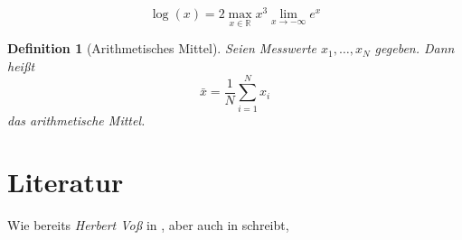 \documentclass[
    fontsize=11pt,%
    paper=b5,%
    headings=small,
    parskip=half,
    listof=totoc,
    bibliography=totoc,
    pagesize
]{scrbook}
\theoremstyle{break}
\newtheorem{definition}{Definition}[chapter]
\theoremstyle{plain}
\newcommand{\autor}[1]{\textit{#1}} %
\begin{document}
\[
\log(x)=2\max_{x\in \mathbb{R}}x^3\lim_{x\to-\infty}e^x
\]

\begin{definition}[Arithmetisches Mittel]
    Seien Messwerte $x_1,\ldots,x_N$ gegeben. Dann heißt
    \begin{equation}
    \bar{x}=\frac{1}{N}\sum_{i=1}^{N}x_i
    \end{equation}
    das arithmetische Mittel.
\end{definition}

\section{Literatur}
Wie bereits \autor{Herbert Voß} in \cite[12--16]{Voss.2012}, aber auch in \cite[34]{Voss.2007} schreibt,

\cite{Mosgen.1998}

\cite{Mittelbach.2004}
\nocite{*}
\printbibliography[nottype=online]
\printbibliography[type=online]
\end{document}
